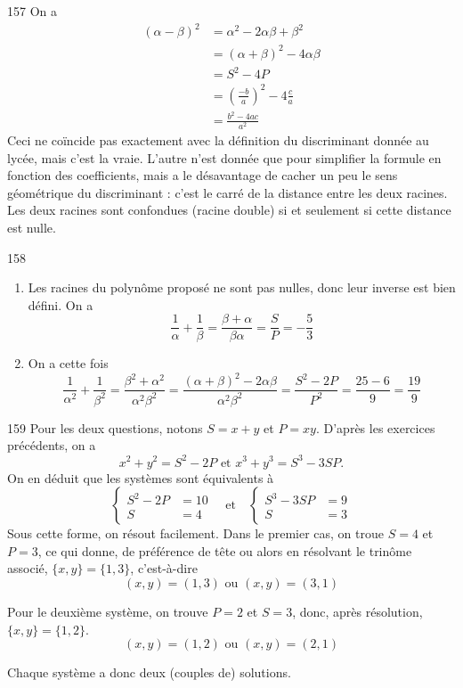 \begin{Soln}{157}
On a
\begin{align*}
(\alpha-\beta)^2
&= \alpha^2-2\alpha\beta + \beta^2\\
&= (\alpha+\beta)^2 - 4\alpha\beta\\
&= S^2-4P\\
&= \left(\frac{-b}{a}\right)^2 - 4\frac{c}{a}\\
&= \frac{b^2-4ac}{a^2}
\end{align*}
Ceci ne coïncide pas exactement avec la définition du discriminant donnée au lycée, mais c'est la \og vraie\fg. L'autre n'est donnée que pour simplifier la formule en fonction des coefficients, mais a le désavantage de cacher un peu le sens géométrique du discriminant : c'est le carré de la distance entre les deux racines. Les deux racines sont confondues (racine double) si et seulement si cette distance est nulle.
\end{Soln}
\begin{Soln}{158}
\begin{enumerate}
\item Les racines du polynôme proposé ne sont pas nulles, donc leur inverse est bien défini. On a
\[\frac{1}{\alpha}+\frac{1}{\beta}
= \frac{\beta+\alpha}{\beta\alpha}
= \frac{S}{P}
= -\frac{5}{3}\]
\item On a cette fois
\[
\frac{1}{\alpha^2}+\frac{1}{\beta^2}
= \frac{\beta^2+\alpha^2}{\alpha^2\beta^2}
= \frac{(\alpha+\beta)^2-2\alpha\beta}{\alpha^2\beta^2}
= \frac{S^2-2P}{P^2}
= \frac{25-6}{9} = \frac{19}{9}
\]
\end{enumerate}

\end{Soln}
\begin{Soln}{159}
Pour les deux questions, notons $S=x+y$ et $P=xy$. D'après les exercices précédents, on a
\[x^2+y^2=S^2-2P \text{ et } x^3+y^3 = S^3-3SP. \]
On en déduit que les systèmes sont équivalents à
\[
\begin{cases}
S^2-2P&=10\\
S&=4
\end{cases}
\quad\text{et}\quad
\begin{cases}
S^3-3SP&=9\\
S&=3
\end{cases}
\]
Sous cette forme, on résout facilement. Dans le premier cas, on troue $S=4$ et $P=3$, ce qui donne, de préférence de tête ou alors en résolvant le trinôme associé, $\{x,y\} = \{1,3\}$, c'est-à-dire
\[ (x,y)=(1,3) \text{ ou } (x,y)=(3,1)\]

Pour le deuxième système, on trouve $P=2$ et $S=3$, donc, après résolution, $\{x,y\}=\{1,2\}$.
\[ (x,y)=(1,2) \text{ ou } (x,y)=(2,1)\]

Chaque système a donc deux (couples de) solutions.
\end{Soln}
